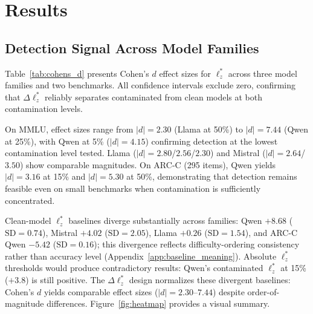 \section{Results}
\label{sec:results}

\subsection{Detection Signal Across Model Families}
\label{sec:detection}

Table~\ref{tab:cohens_d} presents Cohen's $d$ effect sizes for $\ell_z^*$ across three model families and two benchmarks.
All confidence intervals exclude zero, confirming that $\Delta\ell_z^*$ reliably separates contaminated from clean models at both contamination levels.

On MMLU, effect sizes range from $|d|{=}2.30$ (Llama at 50\%) to $|d|{=}7.44$ (Qwen at 25\%), with Qwen at 5\% ($|d|{=}4.15$) confirming detection at the lowest contamination level tested. Llama ($|d|{=}2.80$/$2.56$/$2.30$) and Mistral ($|d|{=}2.64$/$3.50$) show comparable magnitudes.
On ARC-C (295 items), Qwen yields $|d|{=}3.16$ at 15\% and $|d|{=}5.30$ at 50\%, demonstrating that detection remains feasible even on small benchmarks when contamination is sufficiently concentrated.

Clean-model $\ell_z^*$ baselines diverge substantially across families: Qwen ${+}8.68$ ($\text{SD}{=}0.74$), Mistral ${+}4.02$ ($\text{SD}{=}2.05$), Llama ${+}0.26$ ($\text{SD}{=}1.54$), and ARC-C Qwen ${-}5.42$ ($\text{SD}{=}0.16$); this divergence reflects difficulty-ordering consistency rather than accuracy level (Appendix~\ref{app:baseline_meaning}).
Absolute $\ell_z^*$ thresholds would produce contradictory results: Qwen's contaminated $\ell_z^*$ at 15\% (${+}3.8$) is still positive.
The $\Delta\ell_z^*$ design normalizes these divergent baselines: Cohen's $d$ yields comparable effect sizes ($|d|{=}2.30$--$7.44$) despite order-of-magnitude differences.
Figure~\ref{fig:heatmap} provides a visual summary.

